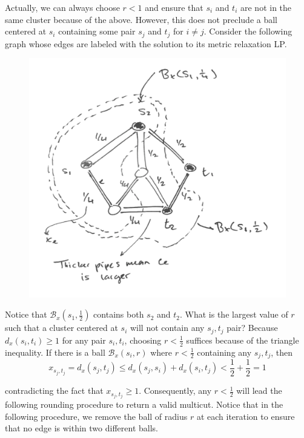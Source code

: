 Actually, we can always choose $r < 1$ and ensure that $s_i$ and $t_i$ are not in the same cluster because of the above. However, this does not preclude a ball centered at $s_i$ containing some pair $s_j$ and $t_j$ for $i \neq j$. Consider the following graph whose edges are labeled with the solution to its metric relaxation LP.

\begin{figure}[h!]
\centering
\includegraphics[scale=0.45]{images/image-1.png}
\end{figure}
\vspace{-1em}

Notice that $\mathcal{B}_x(s_1, \frac{1}{2})$ contains both $s_2$ and $t_2$. What is the largest value of $r$ such that a cluster centered at $s_i$ will not contain any $s_j, t_j$ pair? Because $d_x(s_i, t_i) \geq 1$ for any pair $s_i, t_i$, choosing $r < \frac{1}{2}$ suffices because of the triangle inequality. If there is a ball $\mathcal{B}_x(s_i, r)$ where $r < \frac{1}{2}$ containing any $s_j, t_j$, then
\begin{equation*}
x_{s_j, t_j}
= d_x(s_j, t_j)
\leq d_x(s_j, s_i) + d_x(s_i, t_j)
< \frac{1}{2} + \frac{1}{2}
= 1
\end{equation*}

contradicting the fact that $x_{s_j, t_j} \geq 1$. Consequently, any $r < \frac{1}{2}$ will lead the following rounding procedure to return a valid multicut. Notice that in the following procedure, we remove the ball of radius $r$ at each iteration to ensure that no edge is within two different balls.

